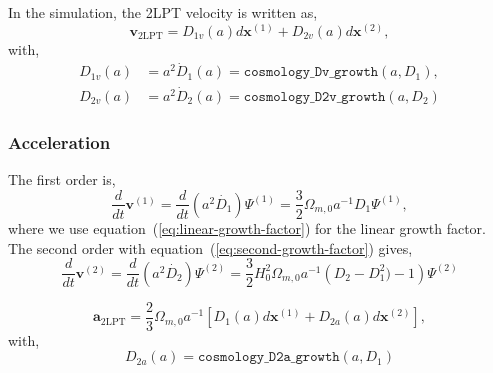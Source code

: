 \documentclass[a4paper]{article}
\begin{document}
\noindent In the simulation, the 2LPT velocity is written as,
\begin{equation}
  \bm{v}_\mathrm{2LPT} = D_{1v}(a) d\bm{x}^{(1)} + D_{2v}(a) d\bm{x}^{(2)},
\end{equation}
with,
\begin{align}
  D_{1v}(a) &= a^2 \dot{D}_1(a) = \texttt{cosmology\_Dv\_growth}(a, D_1),\\
  D_{2v}(a) &= a^2 \dot{D}_2(a) = \texttt{cosmology\_D2v\_growth}(a, D_2)
\end{align}

\subsubsection{Acceleration}
The first order is,
\begin{equation}
  \frac{d}{dt}\bm{v}^{(1)} = \frac{d}{dt} (a^2 \dot{D_1}) \Psi^{(1)}
  = \frac{3}{2} \Omega_{m,0} a^{-1} D_1 \Psi^{(1)},
\end{equation}
where we use equation~(\ref{eq:linear-growth-factor}) for the linear growth factor. The second order with equation~(\ref{eq:second-growth-factor}) gives,
\begin{equation}
  \frac{d}{dt}\bm{v}^{(2)} = \frac{d}{dt} (a^2 \dot{D_2}) \Psi^{(2)}
  = \frac{3}{2} H_0^2 \Omega_{m,0} a^{-1}
    \left(D_2 - D_1^2) - 1\right) \Psi^{(2)}
\end{equation}

\begin{equation}
  \bm{a}_\mathrm{2LPT} = \frac{2}{3} \Omega_{m,0} a^{-1} \left[ D_{1}(a) d\bm{x}^{(1)} + D_{2a}(a) d\bm{x}^{(2)} \right],
\end{equation}
with,
\begin{equation}
  D_{2a}(a) = \texttt{cosmology\_D2a\_growth}(a, D_1)
\end{equation}
\end{document}
